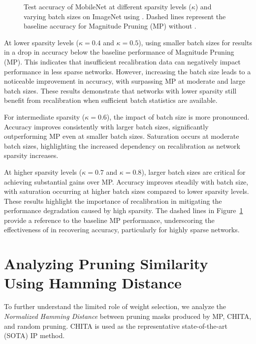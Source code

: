 \begin{figure}[t]
\caption{Test accuracy of MobileNet at different sparsity levels (\(\kappa\)) and varying batch sizes on ImageNet using \REFLOW{}. Dashed lines represent the baseline accuracy for Magnitude Pruning (MP) without \REFLOW{}.}
\label{fig:batch_acc}
\end{figure}



At lower sparsity levels (\(\kappa = 0.4\) and \(\kappa = 0.5\)), using smaller batch sizes for \REFLOW{} results in a drop in accuracy below the baseline performance of Magnitude Pruning (MP). This indicates that insufficient recalibration data can negatively impact performance in less sparse networks. However, increasing the batch size leads to a noticeable improvement in accuracy, with \REFLOW{} surpassing MP at moderate and large batch sizes. These results demonstrate that networks with lower sparsity still benefit from recalibration when sufficient batch statistics are available.

For intermediate sparsity (\(\kappa = 0.6\)), the impact of batch size is more pronounced. Accuracy improves consistently with larger batch sizes, significantly outperforming MP even at smaller batch sizes. Saturation occurs at moderate batch sizes, highlighting the increased dependency on recalibration as network sparsity increases.

At higher sparsity levels (\(\kappa = 0.7\) and \(\kappa = 0.8\)), larger batch sizes are critical for achieving substantial gains over MP. Accuracy improves steadily with batch size, with saturation occurring at higher batch sizes compared to lower sparsity levels. These results highlight the importance of recalibration in mitigating the performance degradation caused by high sparsity. The dashed lines in Figure~\ref{fig:batch_acc} provide a reference to the baseline MP performance, underscoring the effectiveness of \REFLOW{} in recovering accuracy, particularly for highly sparse networks.




\section{Analyzing Pruning Similarity Using Hamming Distance}\label{appendix:pruning_similarity}
To further understand the limited role of weight selection, we analyze the  \textit{Normalized Hamming Distance} between pruning masks produced by MP, CHITA, and random pruning. CHITA is used as the representative state-of-the-art (SOTA) IP method.

